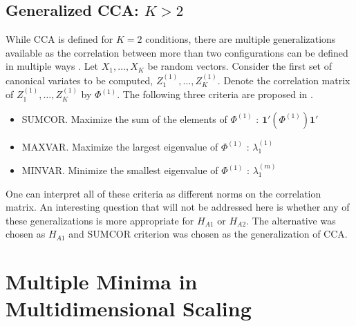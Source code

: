 \documentclass[12pt,oneside,final]{thesis}
\begin{document}
\section{Generalized CCA: $K>2$ \label{sec:GenCCA}}

While CCA is defined for $K=2$ conditions, there are multiple generalizations available as the correlation between more than two configurations can be defined in multiple ways \cite{generalCCA}. Let $X_1,\ldots,X_K$ be random vectors. Consider the first set of canonical variates to be computed, $Z_1^{(1)},\ldots,Z_K^{(1)}$. Denote  the correlation matrix of  $Z_1^{(1)},\ldots,Z_K^{(1)}$ by $\Phi^{(1)}$.   The following three criteria  are proposed in \cite{generalCCA}.
\begin{itemize}
\item SUMCOR. Maximize the sum of the elements of $\Phi^{(1)}$ : $\mathbf{1'}(\Phi^{(1)})\mathbf{1'}$
\item MAXVAR. Maximize the largest eigenvalue of $\Phi^{(1)}$ : $\lambda^{(1)}_1$ 
\item  MINVAR. Minimize  the smallest eigenvalue of $\Phi^{(1)}$ : $\lambda^{(m)}_1$ 
\end{itemize}
One can interpret all of these criteria as different norms on the correlation matrix.
An interesting question that will not be addressed here is whether any of these generalizations is more appropriate for $H_{A1}$ or $H_{A2}$.
The alternative was chosen as $ H_{A1}$ and SUMCOR criterion was chosen as the generalization of CCA.




\chapter{Multiple Minima in  Multidimensional Scaling }
\label{sec:MultMinima}
\end{document}
